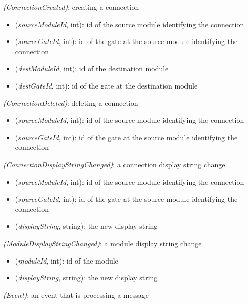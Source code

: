  \textit{(ConnectionCreated)}: creating a connection

\begin{itemize}
  \item {} (\textit{sourceModuleId}, int): id of the source module identifying the connection
  \item {} (\textit{sourceGateId}, int): id of the gate at the source module identifying the connection
  \item {} (\textit{destModuleId}, int): id of the destination module
  \item {} (\textit{destGateId}, int): id of the gate at the destination module
\end{itemize}

 \textit{(ConnectionDeleted)}: deleting a connection

\begin{itemize}
  \item {} (\textit{sourceModuleId}, int): id of the source module identifying the connection
  \item {} (\textit{sourceGateId}, int): id of the gate at the source module identifying the connection
\end{itemize}

 \textit{(ConnectionDisplayStringChanged)}: a connection display string change

\begin{itemize}
  \item {} (\textit{sourceModuleId}, int): id of the source module identifying the connection
  \item {} (\textit{sourceGateId}, int): id of the gate at the source module identifying the connection
  \item {} (\textit{displayString}, string): the new display string
\end{itemize}

 \textit{(ModuleDisplayStringChanged)}: a module display string change

\begin{itemize}
  \item {} (\textit{moduleId}, int): id of the module
  \item {} (\textit{displayString}, string): the new display string
\end{itemize}

 \textit{(Event)}: an event that is processing a message

